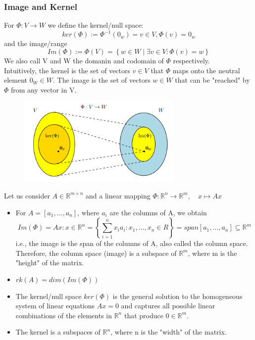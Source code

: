 \subsubsection{Image and Kernel}
\begin{definition}
    For $\Phi : V \rightarrow W$ we define the kernel/null space:
    \[ 
        ker(\Phi) := \Phi^{-1}(0_w) = {v \in V, \Phi(v) = 0_w} 
    \]and the image/range
    \[ 
         Im(\Phi) := \Phi(V) = \left\{ w \in W \mid \exists v \in V : \Phi(v) = w \right\}
    \]
    We also call V and W the domanin and codomain of $\Phi$ respectively.\\
    Intuitively, the kernel is the set of vectors $v\in V$ that $\Phi$ maps onto the neutral element $0_W \in W$. The image is the set of vectors $w \in W$ that can be "reached" by $\Phi$ from any vector in V.
    \begin{figure}[htbp]
        \centering
        \includegraphics[width=8cm]{Mathematical Background/image-kernel.png}
    \end{figure}
\end{definition}
\begin{remark}
    Let us consider $A \in \mathbb{R}^{m\times n}$ and a linear mapping $\Phi: \mathbb{R}^n \longrightarrow \mathbb{R}^m, \quad x \mapsto Ax$
    \begin{itemize}
        \item For $A=[a_{1}, \ldots,a_{n}]$, where $a_i$ are the columns of A, we obtain
        \[ 
            Im(\Phi) = {Ax: x \in \mathbb{R}^n} = \left\{ \sum_{i=1}^{n}{x_ia_i}:x_{1}, \ldots,x_{n}\in R \right\} = span[a_{1}, \ldots,a_{n}]\subseteq \mathbb{R}^m
        \]i.e., the image is the span of the columns of A, also called the column space. Therefore, the column space (image) is a subspace of $\mathbb{R}^m$, where m is the "height" of the matrix.
        \item $rk(A)=dim(Im(\Phi))$
        \item The kernel/null space $ker(\Phi)$ is the general solution to the homogeneous system of linear equations $Ax = 0$ and captures all possible linear combinations of the elements in $\mathbb{R}^n$ that produce $0 \in \mathbb{R}^m$.
        \item The kernel is a subspaces of $\mathbb{R}^n$, where n is the "width" of the matrix. 
    \end{itemize}
\end{remark}

